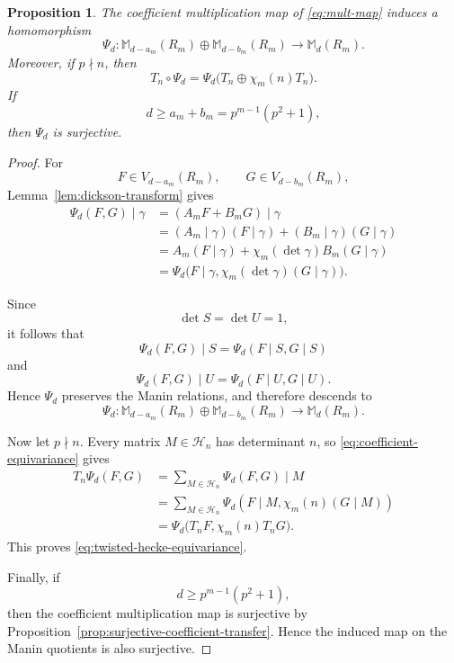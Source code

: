 \documentclass[11pt]{article}
\theoremstyle{plain}
\newtheorem{proposition}[theorem]{Proposition}
\theoremstyle{definition}
\theoremstyle{remark}
\numberwithin{equation}{section}
\begin{document}
\begin{proposition}
\label{prop:transfer-map-surjective}
The coefficient multiplication map of \eqref{eq:mult-map} induces a homomorphism \[\Psi_d: \mathbb M_{d-a_m}(R_m)\oplus
\mathbb M_{d-b_m}(R_m) \longrightarrow \mathbb M_d(R_m).\] Moreover, if \(p\nmid n\), then \begin{equation} T_n\circ\Psi_d =\Psi_d\bigl(T_n\oplus\chi_m(n)T_n\bigr).\label{eq:twisted-hecke-equivariance}\end{equation} If \[d\geq a_m+b_m=p^{m-1}(p^2+1), \] then \(\Psi_d\) is surjective.\end{proposition}

\begin{proof} For \[F\in V_{d-a_m}(R_m), \qquad G\in V_{d-b_m}(R_m), \] Lemma~\ref{lem:dickson-transform} gives \begin{equation}\begin{aligned} \Psi_d(F,G)\mid\gamma &= (A_mF+B_mG)\mid\gamma\\ &= (A_m\mid\gamma)(F\mid\gamma) + (B_m\mid\gamma)(G\mid\gamma)\\ &= A_m(F\mid\gamma) +\chi_m(\det\gamma)B_m(G\mid\gamma)\\ &= \Psi_d\bigl(F\mid\gamma, \chi_m(\det\gamma)(G\mid\gamma) \bigr).\end{aligned}\label{eq:coefficient-equivariance}\end{equation}

Since \[\det S=\det U=1, \] it follows that \[\Psi_d(F,G)\mid S = \Psi_d(F\mid S,G\mid S) \] and \[ \Psi_d(F,G)\mid U = \Psi_d(F\mid U,G\mid U). \] Hence \(\Psi_d\) preserves the Manin relations, and therefore descends to \[ \Psi_d: \mathbb M_{d-a_m}(R_m)\oplus \mathbb M_{d-b_m}(R_m) \longrightarrow \mathbb M_d(R_m). \]

Now let \(p\nmid n\). Every matrix \(M\in\mathcal H_n\) has determinant \(n\), so \eqref{eq:coefficient-equivariance} gives \[ \begin{aligned} T_n\Psi_d(F,G) &= \sum_{M\in\mathcal H_n} \Psi_d(F,G)\mid M\\ &= \sum_{M\in\mathcal H_n} \Psi_d(F\mid M,\chi_m(n)(G\mid M))\\ &= \Psi_d\bigl(T_nF,\chi_m(n)T_nG\bigr). \end{aligned} \] This proves \eqref{eq:twisted-hecke-equivariance}.

Finally, if \[d\geq p^{m-1}(p^2+1),\] then the coefficient multiplication map is surjective by Proposition~\ref{prop:surjective-coefficient-transfer}. Hence the
induced map on the Manin quotients is also surjective.
\end{proof}
\end{document}
